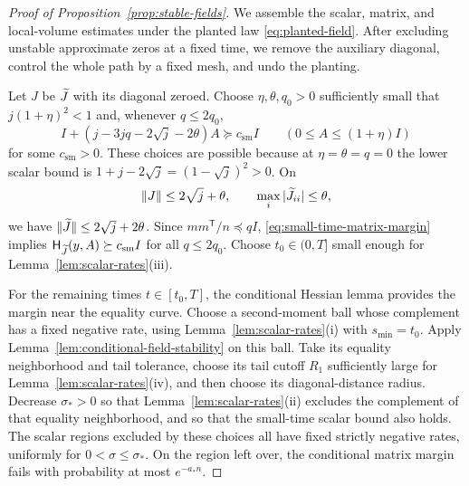 \begin{proof}[Proof of Proposition~\ref{prop:stable-fields}]
We assemble the scalar, matrix, and local-volume estimates under the
planted law \eqref{eq:planted-field}. After excluding unstable
approximate zeros at a fixed time, we remove the auxiliary diagonal,
control the whole path by a fixed mesh, and undo the planting.

Let $J$ be $\widetilde J$ with its diagonal zeroed. Choose
$\eta,\theta,q_0>0$ sufficiently small that
$j(1+\eta)^2<1$ and, whenever $q\le2q_0$,
\begin{equation}
 I+(j-3jq-2\sqrt j-2\theta)A\succeq c_{\mathrm{sm}}I
 \qquad(0\le A\le(1+\eta)I)
 \label{eq:small-time-matrix-margin}
\end{equation}
for some $c_{\mathrm{sm}}>0$.  These choices are possible because at
$\eta=\theta=q=0$ the lower scalar bound is
$1+j-2\sqrt j=(1-\sqrt j)^2>0$.  On
\begin{equation}
 \lVert J\rVert\le2\sqrt j+\theta,\qquad
 \max_i|\widetilde J_{ii}|\le\theta,
 \label{eq:planted-norm-restriction}
\end{equation}
we have $\lVert \widetilde J\rVert\le2\sqrt j+2\theta$.  Since
$mm^{\mathsf T}/n\preceq qI$, \eqref{eq:small-time-matrix-margin}
implies $\mathsf H_{\widetilde J}(y,A)\succeq c_{\mathrm{sm}}I$ for all
$q\le2q_0$.  Choose $t_0\in(0,T]$ small enough for
Lemma~\ref{lem:scalar-rates}\textup{(iii)}.

For the remaining times $t\in[t_0,T]$, the conditional Hessian lemma
provides the margin near the equality curve. Choose a second-moment
ball whose complement has a fixed negative rate, using
Lemma~\ref{lem:scalar-rates}\textup{(i)} with $s_{\min}=t_0$.
Apply Lemma~\ref{lem:conditional-field-stability} on this ball.  Take
its equality neighborhood and tail tolerance, choose its tail cutoff
$R_1$ sufficiently large for
Lemma~\ref{lem:scalar-rates}\textup{(iv)}, and then choose its
diagonal-distance radius.  Decrease $\sigma_*>0$ so that
Lemma~\ref{lem:scalar-rates}\textup{(ii)} excludes the complement of
that equality neighborhood, and so that the small-time scalar bound
also holds. The scalar regions excluded by these choices all have fixed
strictly
negative rates, uniformly for $0<\sigma\le\sigma_*$. On the region
left over, the conditional matrix margin fails with probability at
most $e^{-a_*n}$.


\end{proof}
